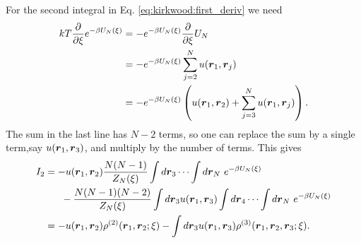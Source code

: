 For the second integral in Eq. \eqref{eq:kirkwood:first_deriv} we need
\begin{align}
kT \frac{\partial}{\partial \xi} 
    e^{-\beta U_N(\xi)} 
&= - e^{-\beta U_N(\xi)} \frac{\partial}{\partial \xi}
    U_N \\
&= - e^{-\beta U_N(\xi)} \sum_{j=2}^N u(\boldsymbol{r}_1,\boldsymbol{r}_j) \\
&=- e^{-\beta U_N(\xi)}\left(
    u(\boldsymbol{r}_1,\boldsymbol{r}_2) +  \sum_{j=3}^N u(\boldsymbol{r}_1,\boldsymbol{r}_j)
    \right).
\end{align}
The sum in the last line has $N-2$ terms, so one can
replace the sum by a single term,say $u(\boldsymbol{r}_1,\boldsymbol{r}_3)$, and multiply by the number of terms.
This gives
\begin{align}
I_2 &= -u(\boldsymbol{r}_1,\boldsymbol{r}_2) \frac{N(N-1)}{Z_N(\xi)}
    \int d\boldsymbol{r}_3 \cdots \int d\boldsymbol{r}_N~ e^{-\beta U_N(\xi)}\\
    &~~~~~- \frac{N(N-1)(N-2)}{Z_N(\xi)}
        \int d\boldsymbol{r}_3 u(\boldsymbol{r}_1,\boldsymbol{r}_3) \int d\boldsymbol{r}_4 \cdots
        \int d\boldsymbol{r}_N~ e^{-\beta U_N(\xi)} \\
&= -u(\boldsymbol{r}_1,\boldsymbol{r}_2)\rho^{(2)}(\boldsymbol{r}_1,\boldsymbol{r}_2;\xi) 
    - \int d\boldsymbol{r}_3 u(\boldsymbol{r}_1,\boldsymbol{r}_3) \rho^{(3)}(\boldsymbol{r}_1,\boldsymbol{r}_2,\boldsymbol{r}_3;\xi).
\end{align}
